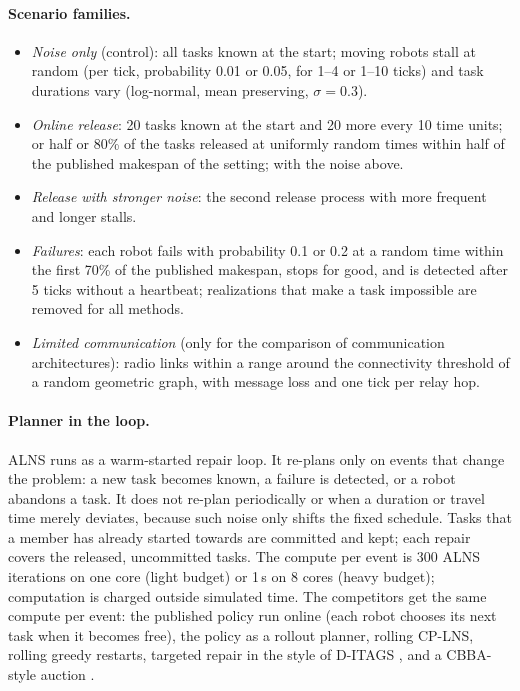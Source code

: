 \documentclass[10pt]{article}
\begin{document}
\paragraph{Scenario families.}
\begin{itemize}
\item \emph{Noise only} (control): all tasks known at the start; moving robots stall at random (per tick, probability
  0.01 or 0.05, for 1--4 or 1--10 ticks) and task durations vary (log-normal, mean preserving, $\sigma = 0.3$).
\item \emph{Online release}: 20 tasks known at the start and 20 more every 10 time units; or half or 80\% of the tasks
  released at uniformly random times within half of the published makespan of the setting; with the noise above.
\item \emph{Release with stronger noise}: the second release process with more frequent and longer stalls.
\item \emph{Failures}: each robot fails with probability 0.1 or 0.2 at a random time within the first 70\% of the
  published makespan, stops for good, and is detected after 5 ticks without a heartbeat; realizations that make a task
  impossible are removed for all methods.
\item \emph{Limited communication} (only for the comparison of communication architectures): radio links within a range
  around the connectivity threshold of a random geometric graph, with message loss and one tick per relay hop.
\end{itemize}

\paragraph{Planner in the loop.} ALNS runs as a warm-started repair loop. It re-plans only on events that change the
problem: a new task becomes known, a failure is detected, or a robot abandons a task. It does not re-plan periodically
or when a duration or travel time merely deviates, because such noise only shifts the fixed schedule. Tasks that a
member has already started towards are committed and kept; each repair covers the released, uncommitted tasks. The
compute per event is 300 ALNS iterations on one core (light budget) or 1\,s on 8 cores (heavy budget); computation is
charged outside simulated time. The competitors get the same compute per event: the published policy run online (each
robot chooses its next task when it becomes free), the policy as a rollout planner, rolling CP-LNS, rolling greedy
restarts, targeted repair in the style of D-ITAGS \cite{neville2023ditags}, and a CBBA-style auction
\cite{choi2009consensus}.
\end{document}
